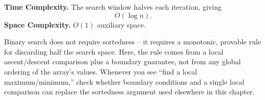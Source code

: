 \begin{complexitybox}
\textbf{Time Complexity.} The search window halves each iteration, giving
\[
  O(\log n).
\]
\textbf{Space Complexity.} $O(1)$ auxiliary space.
\end{complexitybox}

\begin{takeawaybox}
Binary search does not require sortedness -- it requires a monotonic,
provable rule for discarding half the search space. Here, the rule comes
from a local ascent/descent comparison plus a boundary guarantee, not from
any global ordering of the array's values. Whenever you see ``find a local
maximum/minimum,'' check whether boundary conditions and a single local
comparison can replace the sortedness argument used elsewhere in this
chapter.
\end{takeawaybox}
